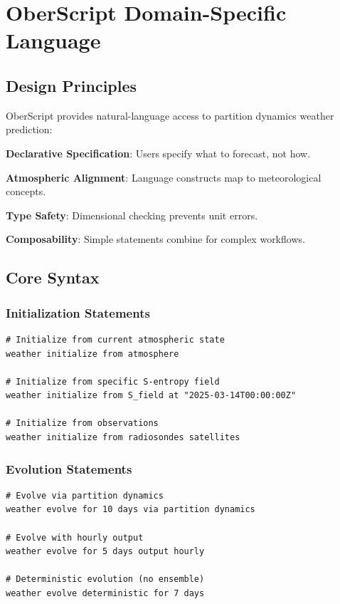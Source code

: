 \documentclass[twocolumn,10pt,a4paper]{article}
\theoremstyle{definition}
\theoremstyle{remark}
\begin{document}
\section{OberScript Domain-Specific Language}
\label{sec:language}

\subsection{Design Principles}

OberScript provides natural-language access to partition dynamics weather prediction:

\textbf{Declarative Specification}: Users specify what to forecast, not how.

\textbf{Atmospheric Alignment}: Language constructs map to meteorological concepts.

\textbf{Type Safety}: Dimensional checking prevents unit errors.

\textbf{Composability}: Simple statements combine for complex workflows.

\subsection{Core Syntax}

\subsubsection{Initialization Statements}

\begin{lstlisting}
# Initialize from current atmospheric state
weather initialize from atmosphere

# Initialize from specific S-entropy field
weather initialize from S_field at "2025-03-14T00:00:00Z"

# Initialize from observations
weather initialize from radiosondes satellites
\end{lstlisting}

\subsubsection{Evolution Statements}

\begin{lstlisting}
# Evolve via partition dynamics
weather evolve for 10 days via partition dynamics

# Evolve with hourly output
weather evolve for 5 days output hourly

# Deterministic evolution (no ensemble)
weather evolve deterministic for 7 days
\end{lstlisting}
\end{document}
